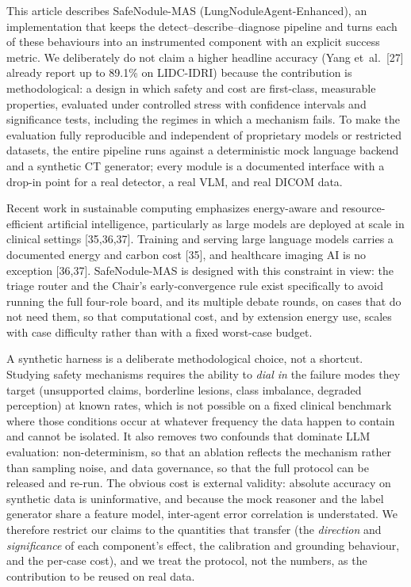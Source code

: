 \documentclass[12pt]{article}
\begin{document}
This article describes SafeNodule-MAS (LungNoduleAgent-Enhanced), an implementation that keeps the detect--describe--diagnose pipeline and turns each of these behaviours into an instrumented component with an explicit success metric. We deliberately do not claim a higher headline accuracy (Yang et~al.~[27] already report up to 89.1\% on LIDC-IDRI) because the contribution is methodological: a design in which safety and cost are first-class, measurable properties, evaluated under controlled stress with confidence intervals and significance tests, including the regimes in which a mechanism fails. To make the evaluation fully reproducible and independent of proprietary models or restricted datasets, the entire pipeline runs against a deterministic mock language backend and a synthetic CT generator; every module is a documented interface with a drop-in point for a real detector, a real VLM, and real DICOM data.


Recent work in sustainable computing emphasizes energy-aware and resource-efficient artificial intelligence, particularly as large models are deployed at scale in clinical settings [35,36,37]. Training and serving large language models carries a documented energy and carbon cost [35], and healthcare imaging AI is no exception [36,37]. SafeNodule-MAS is designed with this constraint in view: the triage router and the Chair's early-convergence rule exist specifically to avoid running the full four-role board, and its multiple debate rounds, on cases that do not need them, so that computational cost, and by extension energy use, scales with case difficulty rather than with a fixed worst-case budget.


A synthetic harness is a deliberate methodological choice, not a shortcut. Studying safety mechanisms requires the ability to \emph{dial in} the failure modes they target (unsupported claims, borderline lesions, class imbalance, degraded perception) at known rates, which is not possible on a fixed clinical benchmark where those conditions occur at whatever frequency the data happen to contain and cannot be isolated. It also removes two confounds that dominate LLM evaluation: non-determinism, so that an ablation reflects the mechanism rather than sampling noise, and data governance, so that the full protocol can be released and re-run. The obvious cost is external validity: absolute accuracy on synthetic data is uninformative, and because the mock reasoner and the label generator share a feature model, inter-agent error correlation is understated. We therefore restrict our claims to the quantities that transfer (the \emph{direction} and \emph{significance} of each component's effect, the calibration and grounding behaviour, and the per-case cost), and we treat the protocol, not the numbers, as the contribution to be reused on real data.
\end{document}
